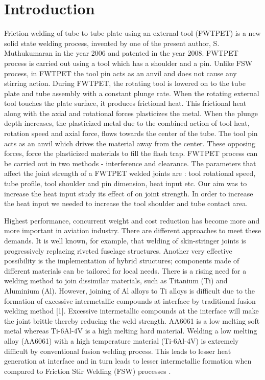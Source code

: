 \documentclass[3p]{elsarticle}
\begin{document}
\linenumbers
								
\section{Introduction}
\label{sec:Introduction}
Friction welding of tube to tube plate using an external tool (FWTPET) is a new solid state welding process, invented by one of the present author, S. Muthukumaran in the year 2006 and patented in the year 2008. FWTPET process is carried out using a tool which has a shoulder and a pin. Unlike FSW process, in FWTPET the tool pin acts as an anvil and does not cause any stirring action\cite{SenthilKumaran2011}. During FWTPET, the rotating tool is lowered on to the tube plate and tube assembly with a constant plunge rate. When the rotating external tool touches the plate surface, it produces frictional heat. This frictional heat along with the axial and rotational forces plasticizes the metal. When the plunge depth increases, the plasticized metal due to the combined action of tool heat, rotation speed and axial force, flows towards the center of the tube. The tool pin acts as an anvil which drives the material away from the center. These opposing forces, force the plasticized materials to fill the flash trap. FWTPET process can be carried out in two methods - interference and clearance.  The parameters that affect the joint strength of a FWTPET welded joints are : tool rotational speed, tube profile, tool shoulder and pin dimension, heat input etc. Our aim was to increase the heat input study its effect of on joint strength. In order to increase the heat input we needed to increase the tool shoulder and tube contact area. 
\par 
Highest performance, concurrent weight and cost reduction has become more and more important in aviation industry. There are different approaches to meet these demands. It is well known, for example, that welding of skin-stringer joints is progressively replacing riveted fuselage structures. Another very effective possibility is the implementation of hybrid structures; components made of different materials can be tailored for local needs. There is a rising need for a welding method to join dissimilar materials, such as Titanium (Ti) and Aluminium (Al). However, joining of Al alloys to Ti alloys is difficult due to the formation of excessive intermetallic compounds at interface by traditional fusion welding method [1]. Excessive intermetallic compounds at the interface will make the joint brittle thereby reducing the weld strength. AA6061 is a low melting soft metal whereas Ti-6Al-4V is a high melting hard material. Welding a low melting alloy (AA6061) with a high temperature material (Ti-6Al-4V) is extremely difficult by conventional fusion welding process. This leads to lesser heat generation at interface and in turn leads to lesser intermetallic formation when compared to Friction Stir Welding (FSW) processes \cite{MadhusudhanReddy2009}.
\end{document}
